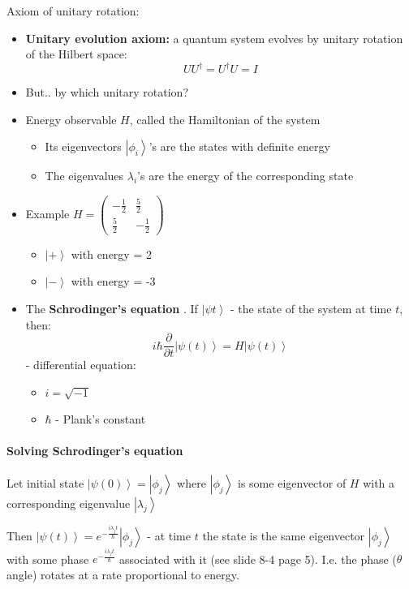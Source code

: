 \documentclass{scrartcl}
\newcommand{\ket}[1]{\left| #1 \right>} %
\begin{document}
Axiom of unitary rotation:
\begin{itemize}
\item {\bf Unitary evolution axiom:} a quantum system evolves by unitary
  rotation of the Hilbert space: $$U U^\dag = U^\dag U = I$$
\item But.. by which unitary rotation?
\item Energy observable $H$, called the Hamiltonian of the
  system \begin{itemize}
  \item Its eigenvectors $\ket{\phi_i}$'s are the states with definite energy
  \item The eigenvalues $\lambda_i$'s are the energy of the corresponding state
  \end{itemize}
\item Example $H = \begin{pmatrix} -\frac12 & \frac52 \\ \frac52 &
    -\frac12 \end{pmatrix}$
  \begin{itemize}
  \item $\ket+$ with energy = 2
  \item $\ket-$ with energy = -3
  \end{itemize}
\item The {\bf Schrodinger's equation }. If $\ket{\psi{t}}$ - the state of the
  system at time $t$, then:
$$i\hbar \frac\partial{\partial t}\ket{\psi(t)} = H\ket{\psi(t)}$$
- differential equation:
\begin{itemize}
\item $i = \sqrt{-1}$
\item $\hbar$ - Plank's constant
\end{itemize}
\end{itemize}

\paragraph{Solving Schrodinger's equation}

Let initial state $\ket{\psi(0)} = \ket{\phi_j}$ where $\ket{\phi_j}$ is some
eigenvector of $H$ with a corresponding eigenvalue $\ket{\lambda_j}$

Then $\ket{\psi(t)} = e^{-\frac{i\lambda_j t}{\hbar}} \ket{\phi_j}$ - at time
$t$ the state is the same eigenvector $\ket{\phi_j}$ with some phase
$e^{-\frac{i\lambda_j t}{\hbar}}$ associated with it (see slide 8-4 page 5).
I.e. the phase ($\theta$ angle) rotates at a rate proportional to energy.
\end{document}
